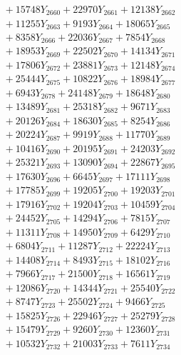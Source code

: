 \documentclass[a4paper,10pt]{article}
\begin{document}
{\begin{align}
&\;  + 15748 Y_{2660} + 22970 Y_{2661} + 12138 Y_{2662} \\[0.3ex]
&\;  + 11255 Y_{2663} + 9193 Y_{2664} + 18065 Y_{2665} \\[0.3ex]
&\;  + 8358 Y_{2666} + 22036 Y_{2667} + 7854 Y_{2668} \\[0.5ex]\allowbreak
&\;  + 18953 Y_{2669} + 22502 Y_{2670} + 14134 Y_{2671} \\[0.3ex]
&\;  + 17806 Y_{2672} + 23881 Y_{2673} + 12148 Y_{2674} \\[0.3ex]
&\;  + 25444 Y_{2675} + 10822 Y_{2676} + 18984 Y_{2677} \\[0.3ex]
&\;  + 6943 Y_{2678} + 24148 Y_{2679} + 18648 Y_{2680} \\[0.3ex]
&\;  + 13489 Y_{2681} + 25318 Y_{2682} + 9671 Y_{2683} \\[0.3ex]
&\;  + 20126 Y_{2684} + 18630 Y_{2685} + 8254 Y_{2686} \\[0.3ex]
&\;  + 20224 Y_{2687} + 9919 Y_{2688} + 11770 Y_{2689} \\[0.3ex]
&\;  + 10416 Y_{2690} + 20195 Y_{2691} + 24203 Y_{2692} \\[0.3ex]
&\;  + 25321 Y_{2693} + 13090 Y_{2694} + 22867 Y_{2695} \\[0.3ex]
&\;  + 17630 Y_{2696} + 6645 Y_{2697} + 17111 Y_{2698} \\[0.5ex]\allowbreak
&\;  + 17785 Y_{2699} + 19205 Y_{2700} + 19203 Y_{2701} \\[0.3ex]
&\;  + 17916 Y_{2702} + 19204 Y_{2703} + 10459 Y_{2704} \\[0.3ex]
&\;  + 24452 Y_{2705} + 14294 Y_{2706} + 7815 Y_{2707} \\[0.3ex]
&\;  + 11311 Y_{2708} + 14950 Y_{2709} + 6429 Y_{2710} \\[0.3ex]
&\;  + 6804 Y_{2711} + 11287 Y_{2712} + 22224 Y_{2713} \\[0.3ex]
&\;  + 14408 Y_{2714} + 8493 Y_{2715} + 18102 Y_{2716} \\[0.3ex]
&\;  + 7966 Y_{2717} + 21500 Y_{2718} + 16561 Y_{2719} \\[0.3ex]
&\;  + 12086 Y_{2720} + 14344 Y_{2721} + 25540 Y_{2722} \\[0.3ex]
&\;  + 8747 Y_{2723} + 25502 Y_{2724} + 9466 Y_{2725} \\[0.3ex]
&\;  + 15825 Y_{2726} + 22946 Y_{2727} + 25279 Y_{2728} \\[0.5ex]\allowbreak
&\;  + 15479 Y_{2729} + 9260 Y_{2730} + 12360 Y_{2731} \\[0.3ex]
&\;  + 10532 Y_{2732} + 21003 Y_{2733} + 7611 Y_{2734} \\[0.3ex]

\end{align}}
\end{document}
